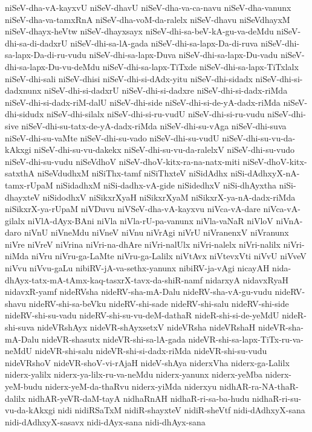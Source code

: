 {niSeV-dha-vA-kayxvU
niSeV-dhavU
niSeV-dha-va-ca-navu
niSeV-dha-vanunx
niSeV-dha-va-tamxRnA
niSeV-dha-voM-da-ralelx
niSeV-dhavu
niSeVdhayxM
niSeV-dhayx-heVtw
niSeV-dhayxsayx
niSeV-dhi-sa-beV-kA-gu-va-deMdu
niSeV-dhi-sa-di-dadxrU
niSeV-dhi-sa-lA-gada
niSeV-dhi-sa-lapx-Da-di-ruva
niSeV-dhi-sa-lapx-Da-di-ru-vudu
niSeV-dhi-sa-lapx-Duva
niSeV-dhi-sa-lapx-Du-vadu
niSeV-dhi-sa-lapx-Du-vu-deMdu
niSeV-dhi-sa-lapx-TiTxde
niSeV-dhi-sa-lapx-TiTxlalx
niSeV-dhi-sali
niSeV-dhisi
niSeV-dhi-si-dAdx-yitu
niSeV-dhi-sidadx
niSeV-dhi-si-dadxnunx
niSeV-dhi-si-dadxrU
niSeV-dhi-si-dadxre
niSeV-dhi-si-dadx-riMda
niSeV-dhi-si-dadx-riM-dalU
niSeV-dhi-side
niSeV-dhi-si-de-yA-dadx-riMda
niSeV-dhi-sidudx
niSeV-dhi-silalx
niSeV-dhi-si-ru-vudU
niSeV-dhi-si-ru-vudu
niSeV-dhi-sive
niSeV-dhi-su-tatx-de-yA-dadx-riMda
niSeV-dhi-su-vAga
niSeV-dhi-suva
niSeV-dhi-su-vaMte
niSeV-dhi-su-vado
niSeV-dhi-su-vudU
niSeV-dhi-su-vu-da-kAkxgi
niSeV-dhi-su-vu-dakekx
niSeV-dhi-su-vu-da-ralelxV
niSeV-dhi-su-vudo
niSeV-dhi-su-vudu
niSeVdhoV
niSeV-dhoV-kitx-ra-na-natx-miti
niSeV-dhoV-kitx-satxthA
niSeVdudhxM
niSiThx-tamf
niSiThxteV
niSidAdhx
niSi-dAdhxyX-nA-tamx-rUpaM
niSidadhxM
niSi-dadhx-vA-gide
niSidedhxV
niSi-dhAyxtha
niSi-dhayxteV
niSidodhxV
niSikxrXyaH
niSikxrXyaM
niSikxrX-ya-nA-dadx-riMda
niSikxrX-ya-rUpaM
niVDuvu
niVSeV-dha-vA-kayxvu
niVca-vA-dare
niVca-vA-gilalx
niVlA-dAyx-BAni
niVla
niVla-rU-pa-vanunx
niVla-vaNaR
niVloV
niVnA-daro
niVnU
niVneMdu
niVneV
niVnu
niVrAgi
niVrU
niVranenxV
niVranunx
niVre
niVreV
niVrina
niVri-na-dhAre
niVri-nalUlx
niVri-nalelx
niVri-nalilx
niVri-niMda
niVru
niVru-ga-LaMte
niVru-ga-Lalilx
niVtAvx
niVtevxVti
niVvU
niVveV
niVvu
niVvu-gaLu
nibiRV-jA-va-sethx-yanunx
nibiRV-ja-vAgi
nicayAH
nida-dhAyx-tatx-mA-tAmx-kaq-tasxrX-tavx-da-shiR-namf
nidarxyA
nidavxRyaH
nidavxR-yamf
nideRVsha
nideRV-sha-mA-Dalu
nideRV-sha-vA-gu-vudu
nideRV-shavu
nideRV-shi-sa-beVku
nideRV-shi-sade
nideRV-shi-salu
nideRV-shi-side
nideRV-shi-su-vadu
nideRV-shi-su-vu-deM-dathaR
nideR-shi-si-de-yeMdU
nideR-shi-suva
nideVRshAyx
nideVR-shAyxsetxV
nideVRsha
nideVRshaH
nideVR-sha-mA-Dalu
nideVR-shasutx
nideVR-shi-sa-lA-gada
nideVR-shi-sa-lapx-TiTx-ru-va-neMdU
nideVR-shi-salu
nideVR-shi-si-dadx-riMda
nideVR-shi-su-vudu
nideVRshoV
nideVR-shoV-vi-rAjaH
nideV-shAya
niderxVha
niderx-ga-Lalilx
niderx-yalilx
niderx-ya-lilx-ru-va-neMdu
niderx-yanunx
niderx-yeMba
niderx-yeM-budu
niderx-yeM-da-thaRvu
niderx-yiMda
niderxyu
nidhAR-ra-NA-thaR-dalilx
nidhAR-yeVR-daM-tayA
nidhaRnAH
nidhaR-ri-sa-ba-hudu
nidhaR-ri-su-vu-da-kAkxgi
nidi
nidiRSaTxM
nidiR-shayxteV
nidiR-sheVtf
nidi-dAdhxyX-sana
nidi-dAdhxyX-sasavx
nidi-dAyx-sana
nidi-dhAyx-sana
}

